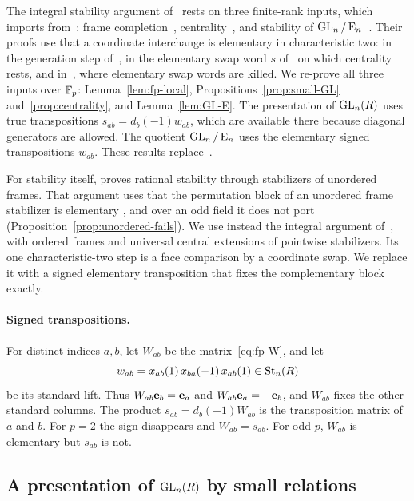 The integral stability argument of~\cite[Section~7]{OAI247rf} rests on three finite-rank inputs, which
\cite[Proposition~7.1]{OAI247rf} imports from~\cite{OAI247periodic}: frame completion~\cite[Lemma~5.1]{OAI247periodic},
centrality~\cite[Proposition~5.4]{OAI247periodic}, and stability of $\operatorname{GL}_n/\operatorname{E}_n$~\cite[Lemma~5.5]{OAI247periodic}.
Their proofs use that a coordinate interchange is elementary in characteristic two: in the generation step
of~\cite[Lemma~5.1]{OAI247periodic}, in the elementary swap word $s$ of~\cite[Proposition~5.3]{OAI247periodic} on which
centrality rests, and in~\cite[Lemma~5.5]{OAI247periodic}, where elementary swap words are killed. We re-prove all
three inputs over $\mathbb F_p$: Lemma~\ref{lem:fp-local}, Propositions~\ref{prop:small-GL} and~\ref{prop:centrality}, and
Lemma~\ref{lem:GL-E}. The presentation of $\operatorname{GL}_n(R)$ uses true transpositions $s_{ab}=d_b(-1)w_{ab}$, which are
available there because diagonal generators are allowed. The quotient $\operatorname{GL}_n/\operatorname{E}_n$ uses the elementary signed
transpositions $w_{ab}$. These results replace~\cite[Proposition~7.1]{OAI247rf}.

For stability itself, \cite{OAI247periodic} proves rational stability through stabilizers of unordered frames. That
argument uses that the permutation block of an unordered frame stabilizer is elementary
\cite[proof of Lemma~5.9]{OAI247periodic}, and over an odd field it does not port
(Proposition~\ref{prop:unordered-fails}). We use instead the integral argument of~\cite[Section~7]{OAI247rf}, with
ordered frames and universal central extensions of pointwise stabilizers. Its one characteristic-two step is a face
comparison by a coordinate swap. We replace it with a signed elementary transposition that fixes the complementary block
exactly.

\paragraph{Signed transpositions.}
For distinct indices $a,b$, let $W_{ab}$ be the matrix~\eqref{eq:fp-W}, and let
\[
 w_{ab}=x_{ab}(1)\,x_{ba}(-1)\,x_{ab}(1)\in\operatorname{St}_n(R)
\]
be its standard lift. Thus $W_{ab}\mathbf e_b=\mathbf e_a$ and $W_{ab}\mathbf e_a=-\mathbf e_b$, and $W_{ab}$ fixes the other
standard columns. The product $s_{ab}=d_b(-1)W_{ab}$ is the transposition matrix of $a$ and $b$. For $p=2$ the sign
disappears and $W_{ab}=s_{ab}$. For odd $p$, $W_{ab}$ is elementary but $s_{ab}$ is not.

\subsection{A presentation of \texorpdfstring{$\operatorname{GL}_n(R)$}{GL\_n(R)} by small relations}

